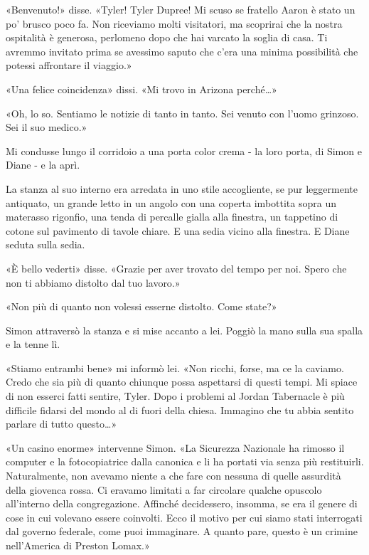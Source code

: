 «Benvenuto!» disse. «Tyler! Tyler Dupree! Mi scuso se fratello Aaron è
stato un po' brusco poco fa. Non riceviamo molti visitatori, ma
scoprirai che la nostra ospitalità è generosa, perlomeno dopo che hai
varcato la soglia di casa. Ti avremmo invitato prima se avessimo saputo
che c'era una minima possibilità che potessi affrontare il viaggio.»

«Una felice coincidenza» dissi. «Mi trovo in Arizona perché\ldots»

«Oh, lo so. Sentiamo le notizie di tanto in tanto. Sei venuto con l'uomo
grinzoso. Sei il suo medico.»

Mi condusse lungo il corridoio a una porta color crema - la loro porta,
di Simon e Diane - e la aprì.

La stanza al suo interno era arredata in uno stile accogliente, se pur
leggermente antiquato, un grande letto in un angolo con una coperta
imbottita sopra un materasso rigonfio, una tenda di percalle gialla alla
finestra, un tappetino di cotone sul pavimento di tavole chiare. E una
sedia vicino alla finestra. E Diane seduta sulla sedia.

\separatorefiori

«È bello vederti» disse. «Grazie per aver trovato del tempo per noi.
Spero che non ti abbiamo distolto dal tuo lavoro.»

«Non più di quanto non volessi esserne distolto. Come state?»

Simon attraversò la stanza e si mise accanto a lei. Poggiò la mano sulla
sua spalla e la tenne lì.

«Stiamo entrambi bene» mi informò lei. «Non ricchi, forse, ma ce la
caviamo. Credo che sia più di quanto chiunque possa aspettarsi di questi
tempi. Mi spiace di non esserci fatti sentire, Tyler. Dopo i problemi al
Jordan Tabernacle è più difficile fidarsi del mondo al di fuori della
chiesa. Immagino che tu abbia sentito parlare di tutto questo\ldots»

«Un casino enorme» intervenne Simon. «La Sicurezza Nazionale ha rimosso
il computer e la fotocopiatrice dalla canonica e li ha portati via senza
più restituirli. Naturalmente, non avevamo niente a che fare con nessuna
di quelle assurdità della giovenca rossa. Ci eravamo limitati a far
circolare qualche opuscolo all'interno della congregazione. Affinché
decidessero, insomma, se era il genere di cose in cui volevano essere
coinvolti. Ecco il motivo per cui siamo stati interrogati dal governo
federale, come puoi immaginare. A quanto pare, questo è un crimine
nell'America di Preston Lomax.»


